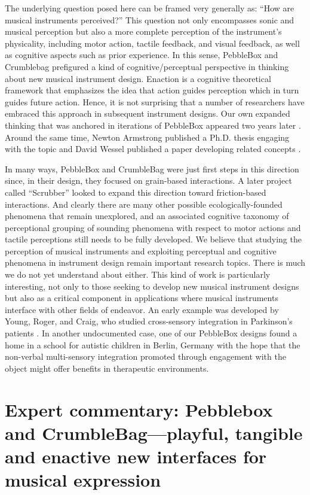 The underlying question posed here can be framed very generally as: ``How are musical instruments perceived?'' This question not only encompasses sonic and musical perception but also a more complete perception of the instrument's physicality, including motor action, tactile feedback, and visual feedback, as well as cognitive aspects such as prior experience. In this sense, PebbleBox and Crumblebag  prefigured a kind of cognitive/perceptual perspective in thinking about new musical instrument design. Enaction is a cognitive theoretical framework that emphasizes the idea that action guides perception which in turn guides future action.  Hence, it is not surprising that a number of researchers have embraced this approach in subsequent instrument designs.  Our own expanded thinking that was anchored in iterations of PebbleBox appeared two years later \cite{Essl:2006}. Around the same time, Newton Armstrong published a Ph.D. thesis engaging with the topic \cite{Armstrong:2006} and David Wessel published a paper developing related concepts \cite{Wessel:2006}. 

In many ways, PebbleBox and CrumbleBag were just first steps in this direction since, in their design, they focused on grain-based interactions. A later project called ``Scrubber'' looked to expand this direction toward friction-based interactions. And clearly there are many other possible ecologically-founded phenomena that remain unexplored, and an associated cognitive taxonomy of perceptional grouping of sounding phenomena with respect to motor actions and tactile perceptions still needs to be fully developed. We believe that studying the perception of musical instruments and exploiting perceptual and cognitive phenomena in instrument design remain important research topics. There is much we do not yet understand about either. This kind of work is particularly interesting, not only to those seeking to develop new musical instrument designs but also as a critical component in applications where musical instruments interface with other fields of endeavor.  An early example was developed by Young, Roger, and Craig, who studied cross-sensory integration in Parkinson's patients \cite{Young:2014}. In another undocumented case, one of our PebbleBox designs found a home in a school for autistic children in Berlin, Germany with the hope that the non-verbal multi-sensory integration promoted through engagement with the object might offer benefits in therapeutic environments. 

\section*{Expert commentary: Pebblebox and CrumbleBag---playful, tangible and enactive new interfaces for musical expression}
